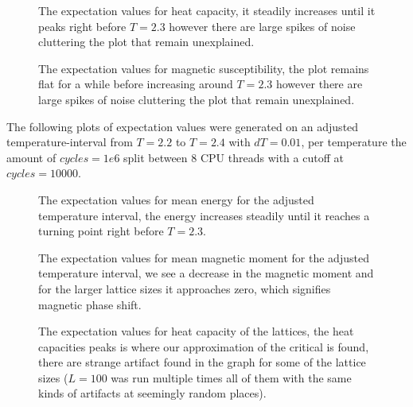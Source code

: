 \documentclass{emulateapj}
\begin{document}
%
%
\begin{figure}[H]

\mbox{}

\caption{The expectation values for heat capacity, it steadily increases until it peaks right before $T=2.3$ however there are large spikes of noise cluttering the plot that remain unexplained.}
\label{fig:HCMean}
\end{figure}
%
%
\begin{figure}[H]

\mbox{}

\caption{The expectation values for magnetic susceptibility, the plot remains flat for a while before increasing around $T=2.3$ however there are large spikes of noise cluttering the plot that remain unexplained.}
\label{fig:SMean}
\end{figure}
%
The following plots of expectation values were generated on an adjusted temperature-interval from $T=2.2$ to $T=2.4$ with $dT=0.01$, per temperature the amount of $cycles=1e6$ split between 8 CPU threads with a cutoff at $cycles=10000$.
%
\begin{figure}[H]

\mbox{}

\caption{The expectation values for mean energy for the adjusted temperature interval, the energy increases steadily until it reaches a turning point right before $T=2.3$.}
\label{fig:Emean2}
\end{figure}
%
%
\begin{figure}[H]

\mbox{}

\caption{The expectation values for mean magnetic moment for the adjusted temperature interval, we see a decrease in the magnetic moment and for the larger lattice sizes it approaches zero, which signifies magnetic phase shift.}
\label{fig:Mmean2}
\end{figure}
%
%
\begin{figure}[H]

\mbox{}

\caption{The expectation values for heat capacity of the lattices, the heat capacities peaks is where our approximation of the critical is found, there are strange artifact found in the graph for some of the lattice sizes ($L=100$ was run multiple times all of them with the same kinds of artifacts at seemingly random places).}
\label{fig:HCMean2}
\end{figure}
\end{document}
